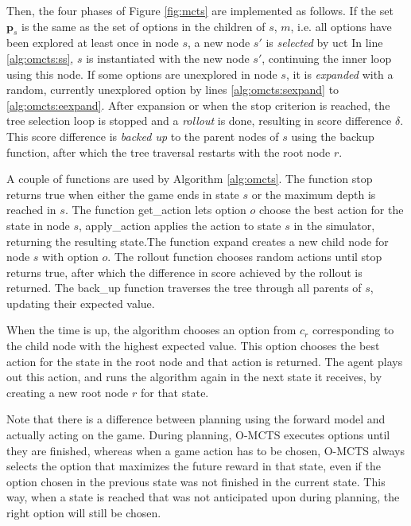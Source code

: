 Then, the four phases of Figure \ref{fig:mcts} are implemented as follows.  If
the set $\mathbf{p}_s$ is the same as the set of options in the children of $s$,
$m$, i.e. all options have been explored at least once in node $s$, a new node
$s'$ is \emph{selected} by \textsf{uct} In line \ref{alg:omcts:ss}, $s$ is
instantiated with the new node $s'$, continuing the inner loop using this node.
If some options are unexplored in node $s$, it is \emph{expanded} with a random,
currently unexplored option by lines \ref{alg:omcts:sexpand} to
\ref{alg:omcts:eexpand}. After expansion or when the stop criterion is reached,
the tree selection loop is stopped and a \emph{rollout} is done, resulting in
score difference $\delta$. This score difference is \emph{backed up} to the
parent nodes of $s$ using the backup function, after which the tree traversal
restarts with the root node $r$.

A couple of functions are used by Algorithm \ref{alg:omcts}. The function
\textsf{stop} returns true when either the game ends in state $s$ or the maximum
depth is reached in $s$. The function \textsf{get\_action} lets option $o$
choose the best action for the state in node $s$, \textsf{apply\_action} applies
the action to state $s$ in the simulator, returning the resulting state.The
function \textsf{expand} creates a new child node for node $s$ with option $o$.
The \textsf{rollout} function chooses random actions until \textsf{stop} returns
true, after which the difference in score achieved by the rollout is returned.
The \textsf{back\_up} function traverses the tree through all parents of $s$,
updating their expected value.

When the time is up, the algorithm chooses an option from $c_r$ corresponding to
the child node with the highest expected value. This option chooses the best
action for the state in the root node and that action is returned. The agent
plays out this action, and runs the algorithm again in the next state it
receives, by creating a new root node $r$ for that state. 

Note that there is a difference between planning using the forward model and
actually acting on the game. During planning, O-MCTS executes options until they are
finished, whereas when a game action has to be chosen, O-MCTS always selects the
option that maximizes the future reward in that state, even if the option chosen
in the previous state was not finished in the current state. This way, when a
state is reached that was not anticipated upon during planning, the right option
will still be chosen.
